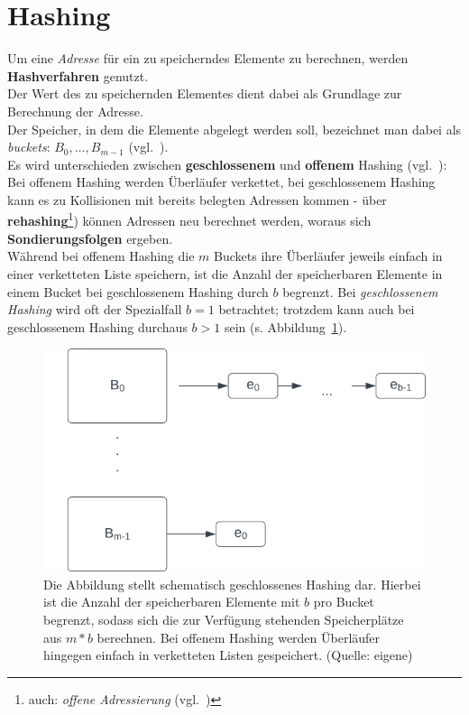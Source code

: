 \section{Hashing}
Um eine \textit{Adresse} für ein zu speicherndes Elemente zu berechnen, werden \textbf{Hashverfahren} genutzt.\\
Der Wert des zu speichernden Elementes dient dabei als Grundlage zur Berechnung der Adresse.\\
Der Speicher, in dem die Elemente abgelegt werden soll, bezeichnet man dabei als \textit{buckets}: $B_0,\dots , B_{m - 1}$ (vgl.~\cite[115]{GD18d}).\\

\noindent
Es wird unterschieden zwischen \textbf{geschlossenem} und \textbf{offenem} Hashing (vgl.~\cite[116]{GD18d}): Bei offenem Hashing werden Überläufer verkettet, bei geschlossenem Hashing kann es zu Kollisionen mit bereits belegten Adressen kommen - über \textbf{rehashing}\footnote{
auch: \textit{offene Adressierung} (vgl.~\cite[119]{GD18d})
}) können Adressen neu berechnet werden, woraus sich \textbf{Sondierungsfolgen} ergeben.\\

\noindent
Während bei offenem Hashing die $m$ Buckets ihre Überläufer jeweils einfach in einer verketteten Liste speichern, ist die Anzahl der speicherbaren Elemente in einem Bucket bei geschlossenem Hashing durch $b$ begrenzt.
Bei \textit{geschlossenem Hashing} wird oft der Spezialfall $b = 1$ betrachtet; trotzdem kann auch bei geschlossenem Hashing durchaus $b > 1$ sein (s. Abbildung~\ref{fig:openaddressing}).\\

\begin{figure}
\begin{center}
\includegraphics[scale=0.4]{chapters/Datenstrukturen und Algorithmen/img/openaddressing}
\caption{Die Abbildung stellt schematisch geschlossenes Hashing dar. Hierbei ist die Anzahl der speicherbaren Elemente mit $b$ pro Bucket begrenzt, sodass sich die zur Verfügung stehenden Speicherplätze aus $m * b$ berechnen. Bei offenem Hashing werden Überläufer hingegen einfach in verketteten Listen gespeichert. (Quelle: eigene)}
\label{fig:openaddressing}
\end{center}
\end{figure}

